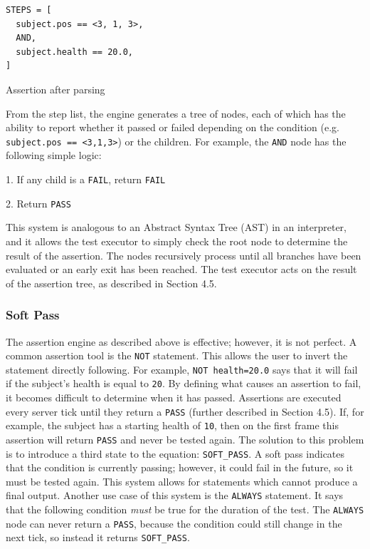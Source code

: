 \documentclass[12pt]{article}
\def\code#1{\texttt{#1}}
\begin{document}
\begin{onehalfspacing}
\begin{listing}[H]
\begin{verbatim}
STEPS = [
  subject.pos == <3, 1, 3>,
  AND,
  subject.health == 20.0,
]
\end{verbatim}
\caption{Assertion after parsing}
\label{lst:4_2_2}
\end{listing}


From the step list, the engine generates a tree of nodes, each of which
has the ability to report whether it passed or failed depending on the
condition (e.g. \code{subject.pos == \textless3,1,3\textgreater}) or the
children. For example, the \code{AND} node has the following simple logic:

1. If any child is a \code{FAIL}, return \code{FAIL}

2. Return \code{PASS}

This system is analogous to an Abstract Syntax Tree (AST) in an
interpreter, and it allows the test executor to simply check the root
node to determine the result of the assertion. The nodes recursively
process until all branches have been evaluated or an early exit has been
reached. The test executor acts on the result of the assertion tree, as
described in Section 4.5.

\subsubsection{Soft Pass}

The assertion engine as described above is effective; however, it is not
perfect. A common assertion tool is the \code{NOT} statement. This allows the
user to invert the statement directly following. For example, \code{NOT
health=20.0} says that it will fail if the subject's health is equal to
\code{20}. By defining what causes an assertion to fail, it becomes difficult
to determine when it has passed. Assertions are executed every server
tick until they return a \code{PASS} (further described in Section 4.5). If,
for example, the subject has a starting health of \code{10}, then on the first
frame this assertion will return \code{PASS} and never be tested again. The
solution to this problem is to introduce a third state to the equation:
\code{SOFT\_PASS}. A soft pass indicates that the condition is currently
passing; however, it could fail in the future, so it must be tested
again. This system allows for statements which cannot produce a final
output. Another use case of this system is the \code{ALWAYS} statement. It says
that the following condition \emph{must} be true for the duration of the
test. The \code{ALWAYS} node can never return a \code{PASS}, because the condition
could still change in the next tick, so instead it returns \code{SOFT\_PASS}.


\end{onehalfspacing}
\end{document}
